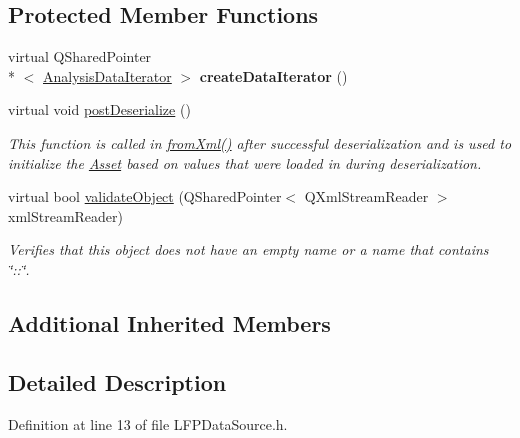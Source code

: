 \subsection*{Protected Member Functions}
\begin{DoxyCompactItemize}
\item 
\hypertarget{class_picto_1_1_l_f_p_data_source_a992018de33203408143a926000aa6514}{virtual Q\-Shared\-Pointer\\*
$<$ \hyperlink{class_picto_1_1_analysis_data_iterator}{Analysis\-Data\-Iterator} $>$ {\bfseries create\-Data\-Iterator} ()}\label{class_picto_1_1_l_f_p_data_source_a992018de33203408143a926000aa6514}

\item 
virtual void \hyperlink{class_picto_1_1_l_f_p_data_source_a4f1fcdb1684600a267ae897cf5799e48}{post\-Deserialize} ()
\begin{DoxyCompactList}\small\item\em This function is called in \hyperlink{class_picto_1_1_asset_a8bed4da09ecb1c07ce0dab313a9aba67}{from\-Xml()} after successful deserialization and is used to initialize the \hyperlink{class_picto_1_1_asset}{Asset} based on values that were loaded in during deserialization. \end{DoxyCompactList}\item 
\hypertarget{class_picto_1_1_l_f_p_data_source_af246826d556df8c246478d4327e072ea}{virtual bool \hyperlink{class_picto_1_1_l_f_p_data_source_af246826d556df8c246478d4327e072ea}{validate\-Object} (Q\-Shared\-Pointer$<$ Q\-Xml\-Stream\-Reader $>$ xml\-Stream\-Reader)}\label{class_picto_1_1_l_f_p_data_source_af246826d556df8c246478d4327e072ea}

\begin{DoxyCompactList}\small\item\em Verifies that this object does not have an empty name or a name that contains \char`\"{}\-::\char`\"{}. \end{DoxyCompactList}\end{DoxyCompactItemize}
\subsection*{Additional Inherited Members}


\subsection{Detailed Description}


Definition at line 13 of file L\-F\-P\-Data\-Source.\-h.



